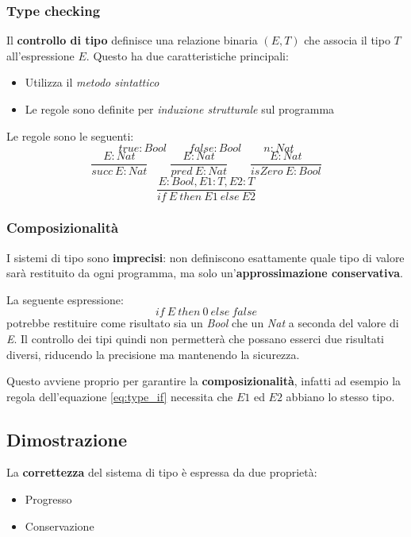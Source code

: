 \subsubsection{Type checking}
Il \textbf{controllo di tipo} definisce una relazione binaria $(E, T)$ che associa il tipo $T$ all'espressione $E$. Questo ha due caratteristiche principali:
\begin{itemize}
	\item Utilizza il \textit{metodo sintattico}
	\item Le regole sono definite per \textit{induzione strutturale} sul programma 
\end{itemize}
Le regole sono le seguenti:
\begin{equation}
	true:Bool \qquad false:Bool \qquad n:Nat
\end{equation}
\begin{equation}
	\frac{E:Nat}{succ \: E : Nat} \qquad \frac{E:Nat}{pred \: E : Nat} \qquad \frac{E:Nat}{isZero\: E : Bool}
\end{equation}
\begin{equation}\label{eq:type_if}
	\frac{E:Bool, E1:T,E2:T}{if \: E \: then \: E1 \: else \: E2}
\end{equation}
\subsubsection{Composizionalità}
I sistemi di tipo sono \textbf{imprecisi}: non definiscono esattamente quale tipo di valore sarà restituito da ogni programma, ma solo un'\textbf{approssimazione conservativa}.
\begin{example}
	La seguente espressione:
	\begin{equation}
		if \: E \: then \: 0 \: else \: false
	\end{equation}
	potrebbe restituire come risultato sia un \textit{Bool} che un \textit{Nat} a seconda del valore di \textit{E}. Il controllo dei tipi quindi non permetterà che possano esserci due risultati diversi, riducendo la precisione ma mantenendo la sicurezza.
\end{example}
Questo avviene proprio per garantire la \textbf{composizionalità}, infatti ad esempio la regola dell'equazione \ref{eq:type_if} necessita che $E1$ ed $E2$ abbiano lo stesso tipo.

\subsection{Dimostrazione}
La \textbf{correttezza} del sistema di tipo è espressa da due proprietà:
\begin{itemize}
	\item Progresso
	\item Conservazione
\end{itemize}

